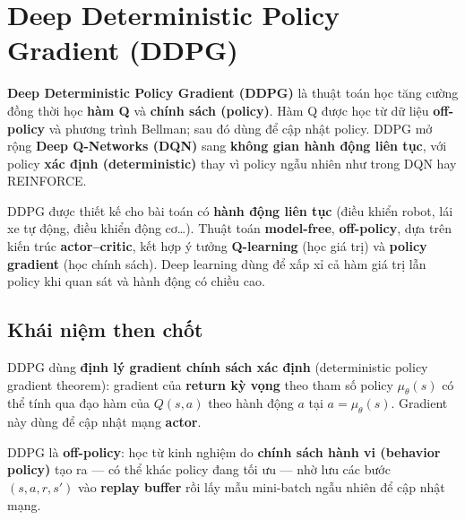 \section{Deep Deterministic Policy Gradient (DDPG)}
\label{sec:ddpg}

\begin{dinhnghia}[title={DDPG}]
\textbf{Deep Deterministic Policy Gradient (DDPG)} là thuật toán học tăng cường đồng thời học \textbf{hàm Q} và \textbf{chính sách (policy)}. Hàm Q được học từ dữ liệu \textbf{off-policy} và phương trình Bellman; sau đó dùng để cập nhật policy. DDPG mở rộng \textbf{Deep Q-Networks (DQN)} sang \textbf{không gian hành động liên tục}, với policy \textbf{xác định (deterministic)} thay vì policy ngẫu nhiên như trong DQN hay REINFORCE.
\end{dinhnghia}

\begin{ynghia}[title={Bối cảnh và feature}]
DDPG được thiết kế cho bài toán có \textbf{hành động liên tục} (điều khiển robot, lái xe tự động, điều khiển động cơ\ldots). Thuật toán \textbf{model-free}, \textbf{off-policy}, dựa trên kiến trúc \textbf{actor--critic}, kết hợp ý tưởng \textbf{Q-learning} (học giá trị) và \textbf{policy gradient} (học chính sách). Deep learning dùng để xấp xỉ cả hàm giá trị lẫn policy khi quan sát và hành động có chiều cao.
\end{ynghia}

\subsection{Khái niệm then chốt}

\begin{ynghia}[title={Định lý Policy Gradient (xác định)}]
DDPG dùng \textbf{định lý gradient chính sách xác định} (deterministic policy gradient theorem): gradient của \textbf{return kỳ vọng} theo tham số policy $\mu_\theta(s)$ có thể tính qua đạo hàm của $Q(s,a)$ theo hành động $a$ tại $a = \mu_\theta(s)$. Gradient này dùng để cập nhật mạng \textbf{actor}.
\end{ynghia}

\begin{ynghia}[title={Off-policy}]
DDPG là \textbf{off-policy}: học từ kinh nghiệm do \textbf{chính sách hành vi (behavior policy)} tạo ra --- có thể khác policy đang tối ưu --- nhờ lưu các bước $(s,a,r,s')$ vào \textbf{replay buffer} rồi lấy mẫu mini-batch ngẫu nhiên để cập nhật mạng.
\end{ynghia}

